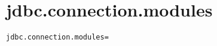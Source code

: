 \section{jdbc.connection.modules}
\label{configuration:JdbcConnectionModules}
\ClearAPI
\TODO
{}
\begin{lstlisting}[style=Props,caption={Usage example for \textit{jdbc.connection.modules}}]
jdbc.connection.modules=
\end{lstlisting}